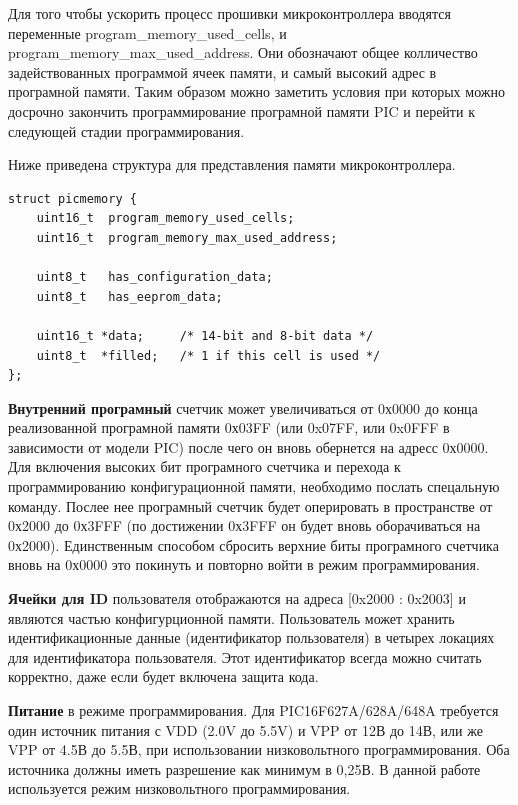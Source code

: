 Для того чтобы ускорить процесс прошивки микроконтроллера вводятся переменные program\_memory\_used\_cells, и program\_memory\_max\_used\_address. Они обозначают общее колличество задействованных программой ячеек памяти, и самый высокий адрес в програмной памяти. Таким образом можно заметить условия при которых можно досрочно закончить программирование програмной памяти PIC и перейти к следующей стадии программирования.

Ниже приведена структура для представления памяти микроконтроллера.

\begin{small}
\begin{verbatim}
struct picmemory {
    uint16_t  program_memory_used_cells;
    uint16_t  program_memory_max_used_address;

    uint8_t   has_configuration_data;
    uint8_t   has_eeprom_data;

    uint16_t *data;     /* 14-bit and 8-bit data */
    uint8_t  *filled;   /* 1 if this cell is used */
};
\end{verbatim}
\end{small}

\textbf{Внутренний програмный}
счетчик может увеличиваться от 0х0000 до 
конца реализованной програмной памяти 0х03FF (или 0x07FF, или 0x0FFF в зависимости от модели PIC)
после чего он вновь обернется на адресс 0х0000.
Для включения высоких бит програмного счетчика и перехода
к программированию конфигурационной памяти, необходимо послать спецальную команду.
Послее нее програмный счетчик будет оперировать в пространстве от 0х2000 до 0х3FFF
(по достижении 0х3FFF он будет вновь оборачиваться на 0х2000). Единственным 
способом сбросить верхние биты програмного счетчика вновь на 0х0000 это покинуть и
повторно войти в режим программирования.

\textbf{Ячейки для ID}
пользователя отображаются на адреса [0x2000 : 0x2003] и являются 
частью конфигурционной памяти. Пользователь может хранить 
идентификационные данные (идентификатор пользователя) в
четырех локациях для идентификатора пользователя. Этот идентификатор всегда можно считать
корректно, даже если будет включена защита кода.

\textbf{Питание}
в режиме программирования. Для PIC16F627A/628A/648A требуется один источник питания с VDD 
(2.0V до 5.5V) и VPP от 12В до 14В, или же VPP от 4.5В до 5.5В, 
при использовании низковольтного программирования. 
Оба источника должны иметь разрешение как минимум в 0,25В. В данной работе 
используется режим низковольтного программирования.

